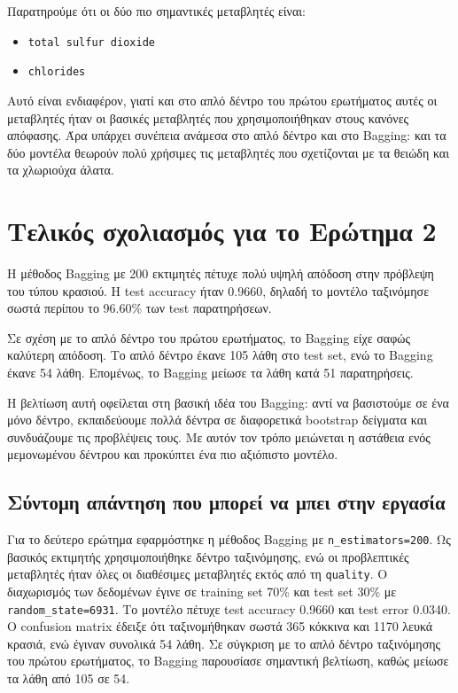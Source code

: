 \documentclass[12pt,a4paper]{article}
\newcommand{\code}[1]{\texttt{\textenglish{#1}}}
\begin{document}
Παρατηρούμε ότι οι δύο πιο σημαντικές μεταβλητές είναι:

\begin{itemize}
    \item \code{total sulfur dioxide}
    \item \code{chlorides}
\end{itemize}

Αυτό είναι ενδιαφέρον, γιατί και στο απλό δέντρο του πρώτου ερωτήματος αυτές
οι μεταβλητές ήταν οι βασικές μεταβλητές που χρησιμοποιήθηκαν στους κανόνες
απόφασης. Άρα υπάρχει συνέπεια ανάμεσα στο απλό δέντρο και στο Bagging: και
τα δύο μοντέλα θεωρούν πολύ χρήσιμες τις μεταβλητές που σχετίζονται με τα
θειώδη και τα χλωριούχα άλατα.

\section{Τελικός σχολιασμός για το Ερώτημα 2}

Η μέθοδος Bagging με 200 εκτιμητές πέτυχε πολύ υψηλή απόδοση στην πρόβλεψη του
τύπου κρασιού. Η test accuracy ήταν 0.9660, δηλαδή το μοντέλο ταξινόμησε σωστά
περίπου το 96.60\% των test παρατηρήσεων.

Σε σχέση με το απλό δέντρο του πρώτου ερωτήματος, το Bagging είχε σαφώς
καλύτερη απόδοση. Το απλό δέντρο έκανε 105 λάθη στο test set, ενώ το Bagging
έκανε 54 λάθη. Επομένως, το Bagging μείωσε τα λάθη κατά 51 παρατηρήσεις.

Η βελτίωση αυτή οφείλεται στη βασική ιδέα του Bagging: αντί να βασιστούμε σε
ένα μόνο δέντρο, εκπαιδεύουμε πολλά δέντρα σε διαφορετικά bootstrap δείγματα
και συνδυάζουμε τις προβλέψεις τους. Με αυτόν τον τρόπο μειώνεται η αστάθεια
ενός μεμονωμένου δέντρου και προκύπτει ένα πιο αξιόπιστο μοντέλο.

\subsection{Σύντομη απάντηση που μπορεί να μπει στην εργασία}

Για το δεύτερο ερώτημα εφαρμόστηκε η μέθοδος Bagging με
\code{n\_estimators=200}. Ως βασικός εκτιμητής χρησιμοποιήθηκε δέντρο
ταξινόμησης, ενώ οι προβλεπτικές μεταβλητές ήταν όλες οι διαθέσιμες μεταβλητές
εκτός από τη \code{quality}. Ο διαχωρισμός των δεδομένων έγινε σε training set
70\% και test set 30\% με \code{random\_state=6931}. Το μοντέλο πέτυχε test
accuracy 0.9660 και test error 0.0340. Ο confusion matrix έδειξε ότι
ταξινομήθηκαν σωστά 365 κόκκινα και 1170 λευκά κρασιά, ενώ έγιναν συνολικά 54
λάθη. Σε σύγκριση με το απλό δέντρο ταξινόμησης του πρώτου ερωτήματος, το
Bagging παρουσίασε σημαντική βελτίωση, καθώς μείωσε τα λάθη από 105 σε 54.
\end{document}

